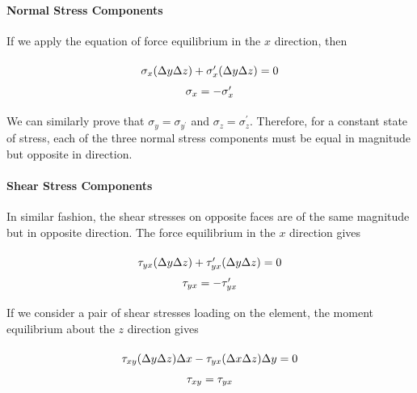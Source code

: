 \documentclass[
fontsize=10pt,
a4paper,
twosides=false,
open=any,
svgnames,
]{kaobook} %
\begin{document}
\paragraph{Normal Stress Components}

If we apply the equation of force equilibrium in the $x$ direction, then

\begin{equation}
  \arraycolsep=1.4pt\def\arraystretch{1.5}
  \begin{array}{c}
    \sigma_x(\Delta y\Delta z) + \sigma_x^\prime(\Delta y\Delta z) = 0\\
    \sigma_x =  - \sigma_x^\prime
  \end{array}
\end{equation}

We can similarly prove that $\sigma_y = \sigma_{y ^\prime}$ and $\sigma_z = \sigma_z ^\prime$. Therefore, for a constant state of stress, each of the three normal stress components must be equal in magnitude but opposite in direction.

\paragraph{Shear Stress Components}

In similar fashion, the shear stresses on opposite faces are of the same magnitude but in opposite direction.
The force equilibrium in the $x$ direction gives

\begin{equation}
  \arraycolsep=1.4pt\def\arraystretch{1.5}
  \begin{array}{c}
    {\tau _{yx}}(\Delta y\Delta z) + {\tau_{yx}^\prime}(\Delta y\Delta z) = 0\\
    {\tau _{yx}} =  - {\tau_{yx}^\prime}
  \end{array}
\end{equation}

If we consider a pair of shear stresses loading on the element, the moment equilibrium about the $z$ direction gives

\begin{equation}
  \arraycolsep=1.4pt\def\arraystretch{1.5}
  \begin{array}{c}
    {\tau _{xy}}(\Delta y\Delta z)\Delta x - {\tau _{yx}}(\Delta x\Delta z)\Delta y = 0\\
    {\tau _{xy}} = {\tau _{yx}}
  \end{array}
\end{equation}
\end{document}
